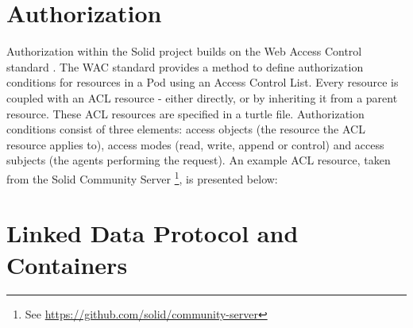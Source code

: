 \section{Authorization}
Authorization within the Solid project builds on the Web Access Control standard \citep{wac}. The WAC standard provides a method to define authorization conditions for resources in a Pod using an Access Control List. Every resource is coupled with an ACL resource - either directly, or by inheriting it from a parent resource. These ACL resources are specified in a turtle file.  Authorization conditions consist of three elements: access objects (the resource the ACL resource applies to), access modes (read, write, append or control) and access subjects (the agents performing the request). An example ACL resource, taken from the Solid Community Server \footnote{See \url{https://github.com/solid/community-server}}, is presented below:


\section{Linked Data Protocol and Containers}
\lipsum[2-3]